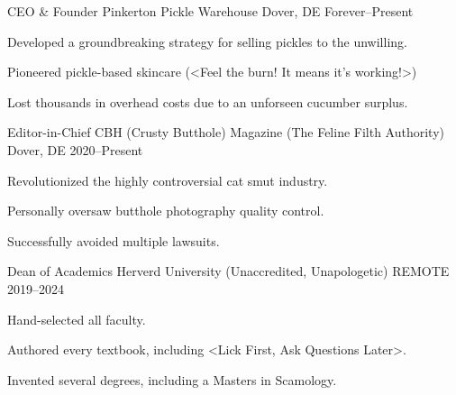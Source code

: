 

\begin{cventries}

  \cventry
    {CEO \& Founder} %
    {Pinkerton Pickle Warehouse} %
    {Dover, DE} %
    {Forever--Present} %
    {
      \begin{cvitems} %
        \item {Developed a groundbreaking strategy for selling pickles to the unwilling.}
        \item {Pioneered pickle-based skincare (<Feel the burn! It means it's working!>)}
        \item {Lost thousands in overhead costs due to an unforseen cucumber surplus.}
      \end{cvitems}
    }

  \cventry
    {Editor-in-Chief} %
    {CBH (Crusty Butthole) Magazine (The Feline Filth Authority)} %
    {Dover, DE} %
    {2020--Present} %
    {
      \begin{cvitems} %
        \item {Revolutionized the highly controversial cat smut industry.}
        \item {Personally oversaw butthole photography quality control.}
        \item {Successfully avoided multiple lawsuits.}
      \end{cvitems}
    }

  \cventry
    {Dean of Academics} %
    {Herverd University (Unaccredited, Unapologetic)} %
    {REMOTE} %
    {2019--2024} %
    {
      \begin{cvitems} %
        \item {Hand-selected all faculty.}
        \item {Authored every textbook, including <Lick First, Ask Questions Later>.}
        \item {Invented several degrees, including a Masters in Scamology.}
      \end{cvitems}
    }


\end{cventries}
